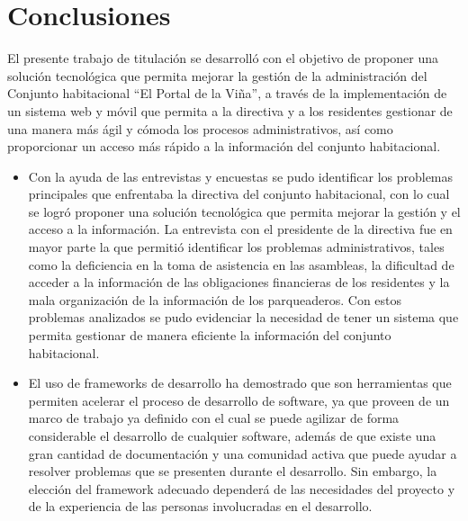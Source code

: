 \section{Conclusiones}

El presente trabajo de titulación se desarrolló con el objetivo de proponer una solución tecnológica que permita mejorar la gestión de la administración del Conjunto habitacional  {\textquotedblleft}El Portal de la Viña{\textquotedblright}, a través de la implementación de un sistema web y móvil que permita a la directiva y a los residentes gestionar de una manera más ágil y cómoda los procesos administrativos, así como proporcionar un acceso más rápido a la información del conjunto habitacional.

\begin{itemize}
    \item Con la ayuda de las entrevistas y encuestas se pudo identificar los problemas principales que enfrentaba la directiva del conjunto habitacional, con lo cual se logró proponer una solución tecnológica que permita mejorar la gestión y el acceso a la información.
    La entrevista con el presidente de la directiva fue en mayor parte la que permitió identificar los problemas administrativos, tales como la deficiencia en la toma de asistencia en las asambleas, la dificultad de acceder a la información de las obligaciones financieras de los residentes y la mala organización de la información de los parqueaderos.
    Con estos problemas analizados se pudo evidenciar la necesidad de tener un sistema que permita gestionar de manera eficiente la información del conjunto habitacional.
    \item El uso de frameworks de desarrollo ha demostrado que son herramientas que permiten acelerar el proceso de desarrollo de software, ya que proveen de un marco de trabajo ya definido con el cual se puede agilizar de forma considerable el desarrollo de cualquier software, además de que existe una gran cantidad de documentación y una comunidad activa que puede ayudar a resolver problemas que se presenten durante el desarrollo.
    Sin embargo, la elección del framework adecuado dependerá de las necesidades del proyecto y de la experiencia de las personas involucradas en el desarrollo.


\end{itemize}
